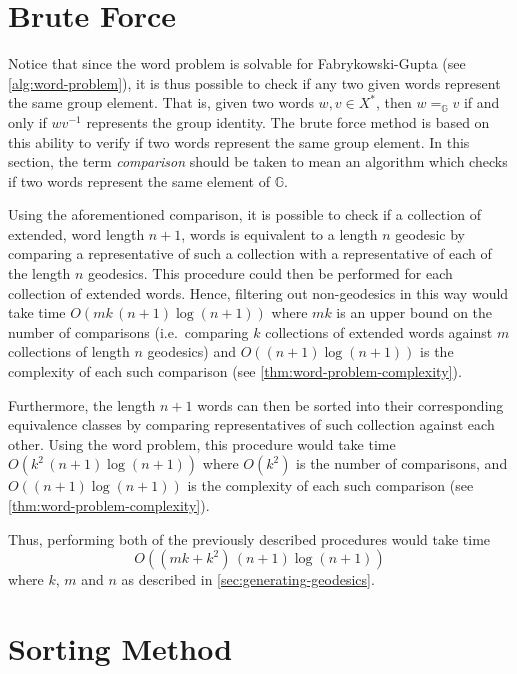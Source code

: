 \section{Brute Force}
\label{sec:brute-force}

Notice that since the word problem is solvable for Fabrykowski-Gupta (see \cref{alg:word-problem}), it is thus possible to check if any two given words represent the same group element.
That is, given two words $w,v \in X^\ast$, then $w =_\mathbb{G} v$ if and only if $wv^{-1}$ represents the group identity.
The brute force method is based on this ability to verify if two words represent the same group element.
In this section, the term \emph{comparison} should be taken to mean an algorithm which checks if two words represent the same element of $\mathbb{G}$.

Using the aforementioned comparison, it is possible to check if a collection of extended, word length $n+1$, words is equivalent to a length $n$ geodesic by comparing a representative of such a collection with a representative of each of the length $n$ geodesics.
This procedure could then be performed for each collection of extended words.
Hence, filtering out non-geodesics in this way would take time $O(m k \, (n+1) \log (n+1))$ where $mk$ is an upper bound on the number of comparisons (i.e.\ comparing $k$ collections of extended words against $m$ collections of length $n$ geodesics) and $O((n+1) \log (n+1))$ is the complexity of each such comparison (see \cref{thm:word-problem-complexity}).

Furthermore, the length $n+1$ words can then be sorted into their corresponding equivalence classes by comparing representatives of such collection against each other.
Using the word problem, this procedure would take time $O(k^2 \, (n+1) \log (n+1))$ where $O(k^2)$ is the number of comparisons, and $O((n+1)\log (n+1))$ is the complexity of each such comparison (see \cref{thm:word-problem-complexity}).

Thus, performing both of the previously described procedures would take time \[O((mk+k^2)\,(n+1)\log (n+1))\]
where $k$, $m$ and $n$ as described in \cref{sec:generating-geodesics}.

\section{Sorting Method}
\label{sec:sortingMethod}

